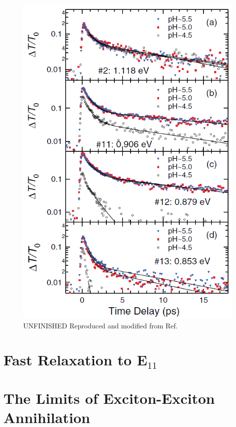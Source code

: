\begin{figure}[ht]
	\centering
	\includegraphics[scale=0.55]{images/chapter_prior_works/dtt_ph_gordana}
	\caption{{\color{red} UNFINISHED } Reproduced and modified from Ref.\ \cite{ostojic2004interband}}
	\label{fig:dtt_ph_gordana}
\end{figure}



\section{Fast Relaxation to E$_\text{11}$ }

\section{The Limits of Exciton-Exciton Annihilation}

